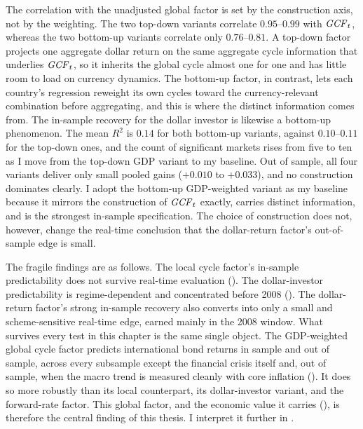 The correlation with the unadjusted global
factor is set by the construction axis, not by the weighting. The two
top-down variants correlate $0.95$--$0.99$ with $\mathit{GCF}_{t}$, whereas the two
bottom-up variants correlate only $0.76$--$0.81$. A top-down factor projects
one aggregate dollar return on the same aggregate cycle information that
underlies $\mathit{GCF}_{t}$, so it inherits the global cycle almost one for one and
has little room to load on currency dynamics. The bottom-up factor, in
contrast, lets each country's regression reweight its own cycles toward the
currency-relevant combination before aggregating, and this is where the
distinct information comes from. The in-sample recovery for the
dollar investor is likewise a bottom-up phenomenon. The mean $R^{2}$ is $0.14$ for
both bottom-up variants, against $0.10$--$0.11$ for the top-down ones, and the count
of significant markets rises from five to ten as I move from the top-down
GDP variant to my baseline. Out of sample, all four variants deliver only
small pooled gains ($+0.010$ to $+0.033$), and no construction dominates
clearly. I adopt the bottom-up GDP-weighted variant as my baseline because it mirrors
the construction of $\mathit{GCF}_{t}$ exactly, carries distinct
information, and is the strongest in-sample specification. The choice of
construction does not, however, change the real-time conclusion that the
dollar-return factor's out-of-sample edge is small.

The fragile findings are as follows. The local cycle
factor's in-sample predictability does not survive real-time evaluation
(). The dollar-investor predictability is regime-dependent and
concentrated before 2008 (). The
dollar-return factor's strong in-sample recovery also converts into only a small
and scheme-sensitive real-time edge, earned mainly in the 2008 window. What survives every
test in this chapter is the same single object. The GDP-weighted global cycle
factor predicts international bond returns in sample and out of sample, across
every subsample except the financial crisis itself and, out of sample, when the
macro trend is measured cleanly with core inflation ().
It does so more robustly than its local counterpart, its dollar-investor variant,
and the forward-rate factor. This
global factor, and the economic value it carries (), is
therefore the central finding of this thesis. I interpret it further in
.
